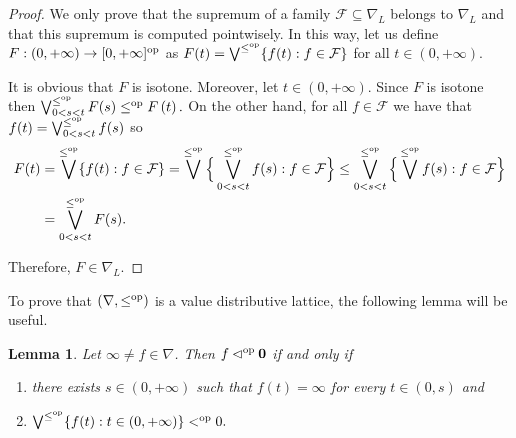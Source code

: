 \documentclass[11pt,a4paper]{amsart}
\newtheorem{lemma}[theorem]{Lemma}
\theoremstyle{definition}
\begin{document}
	\begin{proof}
		We only prove that the supremum of a family $\mathcal{F}\subseteq\nabla_L$ belongs to $\nabla_L$ and that this supremum is computed pointwisely. In this way, let us define $F:(0,+\infty)\to[0,+\infty]^\text{\normalfont op}$ as $F(t)=\bigvee^{{\leq^\text{\normalfont op}}}\{f(t): f\in\mathcal{F}\}$ for all $t\in (0,+\infty)$.
		
		It is obvious that $F$ is isotone. Moreover, let $t\in (0,+\infty).$
		Since $F$ is isotone then $\bigvee^{{\leq^\text{\normalfont op}}}_{0<s<t} F(s)\leq^\text{\normalfont op} F\left(t\right).$ On the other hand, for all $f\in\mathcal{F}$ we have that $f(t)=\bigvee^{{\leq^\text{\normalfont op}}}_{0<s<t} f(s)$ so
		\begin{align*}
			F(t)&=\bigvee^{{\leq^\text{\normalfont op}}}\{f(t): f\in\mathcal{F}\}=\bigvee^{{\leq^\text{\normalfont op}}}\Big\{\bigvee^{{\leq^\text{\normalfont op}}}_{0<s<t} f(s): f\in\mathcal{F}\Big\}\leq  \bigvee^{{\leq^\text{\normalfont op}}}_{0<s<t}\Big\{\bigvee^{{\leq^\text{\normalfont op}}} f(s): f\in\mathcal{F}\Big\}\\
			&=\bigvee^{{\leq^\text{\normalfont op}}}_{0<s<t} F(s).
		\end{align*}
		
		Therefore, $F\in\nabla_L.$
	\end{proof}
	
	
	To prove that $(\nabla,\leq^\text{\normalfont op})$ is a value distributive lattice, the following lemma will be useful.
	
	\begin{lemma}\label{lem:wbnabla}
		Let $\boldsymbol{\infty}\neq f\in \nabla$. Then $f\lhd^\text{\normalfont op} \mathbf{0}$ if and only if
		\begin{enumerate}[(1)]
			\item
			there exists $s\in(0,+\infty)$ such that $f(t)=\infty$ for every $t\in (0,s)$ and
			\item $\bigvee^{\leq^\text{\normalfont op}} \{f(t):t\in (0,+\infty)\}<^\text{\normalfont op}0.$
		\end{enumerate}
	\end{lemma}
	
\end{document}
